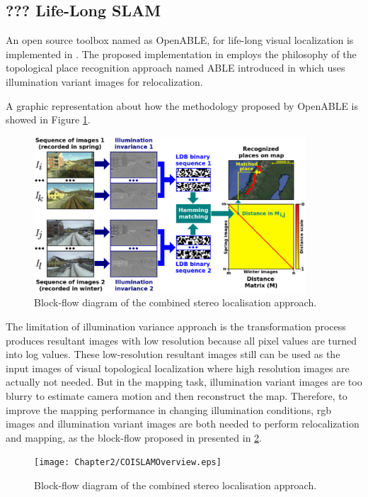 \subsection{??? Life-Long SLAM}

An open source toolbox named as OpenABLE, for life-long visual localization is implemented in \cite{arroyo2016openable}. The proposed implementation in \cite{arroyo2016openable} employs the philosophy of the topological place recognition approach named ABLE introduced in \cite{arroyo2014bidirectional, arroyo2014fast, arroyo2015towards} which uses illumination variant images for relocalization.

A graphic representation about how the methodology proposed by OpenABLE is showed in Figure \ref{fig:openableoverview}.

\begin{figure}[H]
	\centering
	\includegraphics[width=4in]{Chapter2/OPENABLEOverview.eps}
	\caption{Block-flow diagram of the combined stereo localisation approach.}
	\label{fig:openableoverview} 
\end{figure}

The limitation of illumination variance approach is the transformation process produces resultant images with low resolution because all pixel values are turned into log values. These low-resolution resultant images still can be used as the input images of visual topological localization where high resolution images are actually not needed. But in the mapping task, illumination variant images are too blurry to estimate camera motion and then reconstruct the map. Therefore, to improve the mapping performance in changing illumination conditions, rgb images and illumination variant images are both needed to perform relocalization and mapping, as the block-flow proposed in \cite{mcmanus2014shady} presented in \ref{fig:iioverview}.

\begin{figure}[H]
	\centering
	\texttt{[image: Chapter2/COISLAMOverview.eps]}
	\caption{Block-flow diagram of the combined stereo localisation approach.}
	\label{fig:iioverview} 
\end{figure}

\newpage

